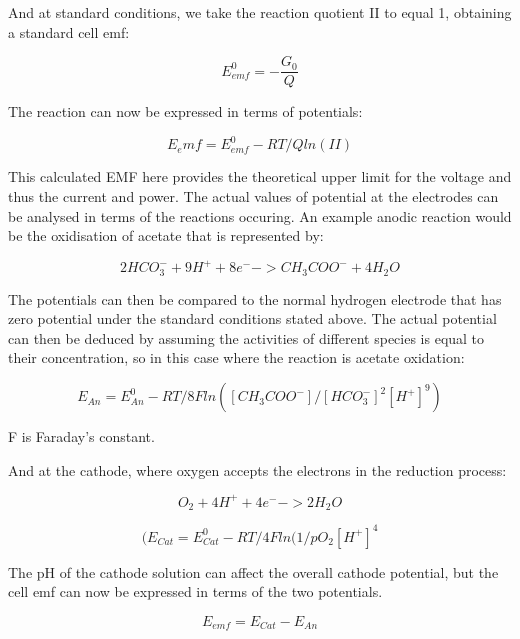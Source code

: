 \documentclass[12pt]{article}
\begin{document}
And at standard conditions, we take the reaction quotient II to equal 1, obtaining a standard cell emf:

\begin{equation}
E^{0}_{emf} = - \frac{G_0}{ Q}
\end{equation}


The reaction can now be expressed in terms of potentials:

\begin{equation}
E_emf = E^{0}_{emf} - RT/Q ln (II)
\end{equation}


This calculated EMF here provides the theoretical upper limit for the voltage and thus the current and power. The actual values of potential at the electrodes can be analysed in terms of the reactions occuring. An example anodic reaction would be the oxidisation of acetate that is represented by:

\begin{equation}
2HCO_{3}^{-} + 9H^{+} + 8e^{-} -> CH_{3}COO^{-} + 4H_{2}O
\end{equation}


The potentials can then be compared to the normal hydrogen electrode that has zero potential under the standard conditions stated above. The actual potential can then be deduced by assuming the activities of different species is equal to their concentration, so in this case where the reaction is acetate oxidation:

\begin{equation}
E_{An} = E_{An}^{0}  - RT / 8F ln ([CH_{3}COO^{-}]/[HCO_{3}^{-}]^{2} [H^{+}]^{9{}})
\end{equation}

F is Faraday's constant.

And at the cathode, where oxygen accepts the electrons in the reduction process:

\begin{equation}
O_{2} + 4H^{+} + 4e^{-} -> 2 H_{2} O
\end{equation}


\begin{equation}
(E_{Cat} = E_{Cat} ^ {0} - RT/4F ln(1/ p O_{2} [H^{+}]^{4}
\end{equation}


The pH of the cathode solution can affect the overall cathode potential, but the cell emf can now be expressed in terms of the two potentials.\cite{logan2006microbial}

\begin{equation}
E_{emf} = E_{Cat} - E_{An}
\end{equation}
 
\end{document}
